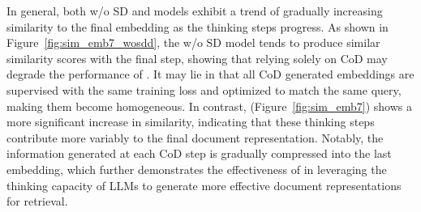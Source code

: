 In general, both \method{} w/o SD and \method{} models exhibit a trend of gradually increasing similarity to the final embedding as the thinking steps progress. As shown in Figure~\ref{fig:sim_emb7_wosdd}, the \method{} w/o SD model tends to produce similar similarity scores with the final step, showing that relying solely on CoD may degrade the performance of \method{}. It may lie in that all CoD generated embeddings are supervised with the same training loss and optimized to match the same query, making them become homogeneous. In contrast, \method{} (Figure~\ref{fig:sim_emb7}) shows a more significant increase in similarity, indicating that these thinking steps contribute more variably to the final document representation. Notably, the information generated at each CoD step is gradually compressed into the last embedding, which further demonstrates the effectiveness of \method{} in leveraging the thinking capacity of LLMs to generate more effective document representations for retrieval. 